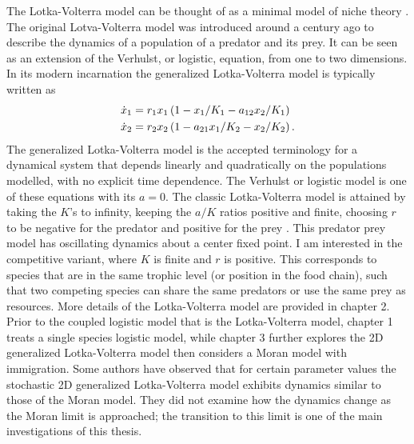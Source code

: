The Lotka-Volterra model can be thought of as a minimal model of niche theory \cite{Haegeman2011}. 
The original Lotva-Volterra model was introduced around a century ago to describe the dynamics of a population of a predator and its prey.
It can be seen as an extension of the Verhulst, or logistic, equation, from one to two dimensions. %
In its modern incarnation the generalized Lotka-Volterra model is typically written as 
\begin{align}
\dot{x}_1 &= r_1 x_1 \left(1 - x_1/K_1 - a_{12}x_2/K_1\right) \\
\dot{x}_2 &= r_2 x_2 \left(1 - a_{21}x_1/K_2 - x_2/K_2\right). \notag 
\end{align} \label{LVeqns}
The generalized Lotka-Volterra model is the accepted terminology for a dynamical system that depends linearly and quadratically on the populations modelled, with no explicit time dependence. 
The Verhulst or logistic model is one of these equations with its $a=0$. 
The classic Lotka-Volterra model is attained by taking the $K$'s to infinity, keeping the $a/K$ ratios positive and finite, choosing $r$ to be negative for the predator and positive for the prey \cite{Lokta1920,Volterra1926}. 
This predator prey model has oscillating dynamics about a center fixed point. 
I am interested in the competitive variant, where $K$ is finite and $r$ is positive. 
This corresponds to species that are in the same trophic level (or position in the food chain), such that two competing species can share the same predators or use the same prey as resources. 
More details of the Lotka-Volterra model are provided in chapter 2. %
Prior to the coupled logistic model that is the Lotka-Volterra model, chapter 1 treats a single species logistic model, while chapter 3 further explores the 2D generalized Lotka-Volterra model then considers a Moran model with immigration. 
Some authors \cite{Lin2012,Constable2015,Chotibut2015,Young2018} have observed that for certain parameter values the stochastic 2D generalized Lotka-Volterra model exhibits dynamics similar to those of the Moran model. 
They did not examine how the dynamics change as the Moran limit is approached; the transition to this limit is one of the main investigations of this thesis. 


